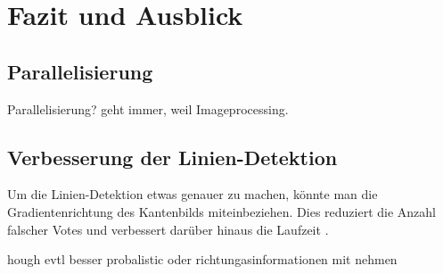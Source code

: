 \chapter{Fazit und Ausblick}
\label{ch:summary}

\section{Parallelisierung}

Parallelisierung?
geht immer, weil Imageprocessing.

\section{Verbesserung der Linien-Detektion}
Um die Linien-Detektion etwas genauer zu machen, könnte man die Gradientenrichtung des Kantenbilds miteinbeziehen. Dies reduziert die Anzahl falscher Votes und verbessert darüber hinaus die Laufzeit \cite{Gorman1976}. 

hough evtl besser probalistic oder richtungasinformationen mit nehmen


